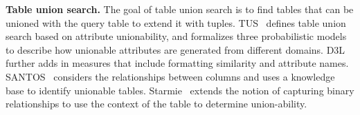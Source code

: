 \textbf{Table union search.} The goal of table union search is to find tables that can be unioned with the query table to extend it with tuples. TUS~\cite{TUS} defines table union search based on attribute unionability, and formalizes three probabilistic models to describe how unionable attributes are
generated from different domains.
D3L~\cite{DatasetDiscovery} further adds in measures that include formatting similarity and attribute names. SANTOS~\cite{santos}
considers the relationships between columns and uses a knowledge base to identify  unionable tables. Starmie~\cite{starmine} extends the notion of capturing binary relationships to use the context of the table to determine union-ability. 
 
 










